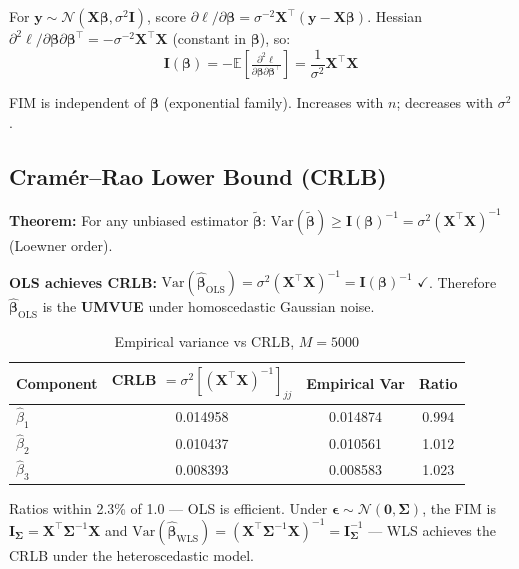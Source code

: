 \documentclass[11pt,a4paper]{article}
\begin{document}
For $\mathbf{y}\sim\mathcal{N}(\mathbf{X}\boldsymbol{\beta},\sigma^2\mathbf{I})$,
score $\partial\ell/\partial\boldsymbol{\beta}=\sigma^{-2}\mathbf{X}^\top(\mathbf{y}-\mathbf{X}\boldsymbol{\beta})$.
Hessian $\partial^2\ell/\partial\boldsymbol{\beta}\partial\boldsymbol{\beta}^\top=-\sigma^{-2}\mathbf{X}^\top\mathbf{X}$
(constant in $\boldsymbol{\beta}$), so:
\begin{equation}
\mathbf{I}(\boldsymbol{\beta})=-\mathbb{E}\!\left[\tfrac{\partial^2\ell}{\partial\boldsymbol{\beta}\partial\boldsymbol{\beta}^\top}\right]=\frac{1}{\sigma^2}\mathbf{X}^\top\mathbf{X}
\end{equation}

FIM is independent of $\boldsymbol{\beta}$ (exponential family). Increases with $n$; decreases with $\sigma^2$.

\subsection*{Cram\'{e}r--Rao Lower Bound (CRLB)}

\textbf{Theorem:} For any unbiased estimator $\tilde{\boldsymbol{\beta}}$:
$\mathrm{Var}(\tilde{\boldsymbol{\beta}})\geq\mathbf{I}(\boldsymbol{\beta})^{-1}=\sigma^2(\mathbf{X}^\top\mathbf{X})^{-1}$
(Loewner order).

\textbf{OLS achieves CRLB:}
$\mathrm{Var}(\hat{\boldsymbol{\beta}}_{\mathrm{OLS}})=\sigma^2(\mathbf{X}^\top\mathbf{X})^{-1}=\mathbf{I}(\boldsymbol{\beta})^{-1}$ $\checkmark$.
Therefore $\hat{\boldsymbol{\beta}}_{\mathrm{OLS}}$ is the \textbf{UMVUE} under homoscedastic Gaussian noise.

\begin{table}[H]
\centering\small
\caption{Empirical variance vs CRLB, $M=5000$}
\begin{tabular}{lccc}
\toprule
\textbf{Component} & \textbf{CRLB} $=\sigma^2[(\mathbf{X}^\top\mathbf{X})^{-1}]_{jj}$
                   & \textbf{Empirical Var} & \textbf{Ratio} \\
\midrule
$\hat{\beta}_1$ & 0.014958 & 0.014874 & 0.994 \\
$\hat{\beta}_2$ & 0.010437 & 0.010561 & 1.012 \\
$\hat{\beta}_3$ & 0.008393 & 0.008583 & 1.023 \\
\bottomrule
\end{tabular}
\end{table}

Ratios within 2.3\% of 1.0 --- OLS is efficient.
Under $\boldsymbol{\epsilon}\sim\mathcal{N}(\mathbf{0},\boldsymbol{\Sigma})$, the FIM is
$\mathbf{I}_{\boldsymbol{\Sigma}}=\mathbf{X}^\top\boldsymbol{\Sigma}^{-1}\mathbf{X}$ and
$\mathrm{Var}(\hat{\boldsymbol{\beta}}_{\mathrm{WLS}})=(\mathbf{X}^\top\boldsymbol{\Sigma}^{-1}\mathbf{X})^{-1}=\mathbf{I}_{\boldsymbol{\Sigma}}^{-1}$
--- WLS achieves the CRLB under the heteroscedastic model.
\end{document}
